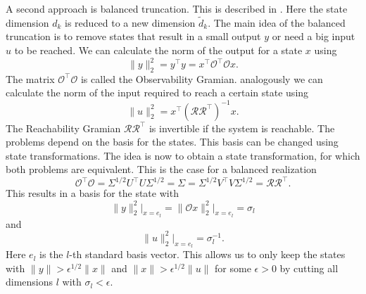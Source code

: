 \documentclass[numbers=noenddot,doctype=mastersthesis,BCOR=15mm,biblatex]{ldvbook}%
\newcommand{\R}{\mathcal{R}} %
\newcommand{\Ob}{\mathcal{O}} %
\begin{document}
A second approach is balanced truncation. 
This is described in \cite{sandberg_balanced_2004,hinrichsen_improved_1990}. 
Here the state dimension $d_k$ is reduced to a new dimension $\tilde{d}_k$.
The main idea of the balanced truncation is to remove states that result in a small output $y$ or need a big input $u$ to be reached.
We can calculate the norm of the output for a state $x$ using
\begin{equation}
	\|y\|_2^2 = y^\top y = x^\top \Ob^\top \Ob x
	.
\end{equation}
The matrix $\Ob^\top \Ob$ is called the Observability Gramian.
analogously we can calculate the norm of the input required to reach a certain state using
\begin{equation}
	\|u\|_2^2 = x^\top (\R\R^\top)^{-1} x
	.
\end{equation}
The Reachability Gramian $\R\R^\top$ is invertible if the system is reachable.
The problems depend on the basis for the states. This basis can be changed using state transformations.
The idea is now to obtain a state transformation, for which both problems are equivalent. 
This is the case for a balanced realization
\begin{equation}
	\Ob^\top \Ob = \Sigma^{1/2}U^\top U\Sigma^{1/2} = \Sigma = \Sigma^{1/2} V^\top V \Sigma^{1/2} = \R \R^\top 
	.
\end{equation}
This results in a basis for the state with 
\begin{equation}
	\|y\|_2^2\big|_{x = e_l} = \|\Ob x\|_2^2\big|_{x = e_l} = \sigma_l
\end{equation}
and 
\begin{equation}
\|u\|_2^2\big|_{x = e_l} = \sigma_l^{-1}
.
\end{equation}
Here $e_l$ is the $l$-th standard basis vector.
This allows us to only keep the states with $\|y\| > \epsilon^{1/2} \|x\|$ and $\|x\| > \epsilon^{1/2} \|u\| $ for some $\epsilon>0$ by cutting all dimensions $l$ with $\sigma_l < \epsilon$.
\end{document}
